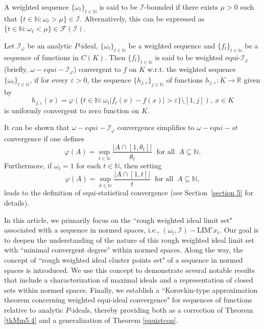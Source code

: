 \documentclass[reqno]{amsart}
\begin{document}
\begin{definition}
A weighted sequence $\{\omega_t\}_{t\in\mathbb{N}}$ is said to be $\mathcal{I}$-bounded if there exists $\mu > 0$ such that  $\{t \in \mathbb{N} : \omega_t > \mu\}\in\mathcal{I}$. Alternatively, this can be expressed as  $\{t \in \mathbb{N} : \omega_t < \mu\}\in\mathcal{F}(\mathcal{I})$.
\end{definition}
\begin{definition}\label{defIequi}
	Let $\mathcal{I}_{\varphi}$ be an analytic $P$-ideal, $\{\omega_t\}_{t\in\mathbb{N}}$ be a weighted sequence and $\{f_t\}_{t\in\mathbb{N}}$ be a sequence of functions in $C(K)$. Then $\{f_t\}_{t\in\mathbb{N}}$ is said to be weighted equi-$\mathcal{I}_{\varphi}$ (briefly, $\omega-equi-\mathcal{I}_{\varphi}$) convergent to $f$ on $K$ w.r.t. the weighted sequence $\{\omega_t\}_{t\in\mathbb{N}}$, if for every $\varepsilon>0$, the sequence $\{h_{j,\varepsilon}\}_{j\in\mathbb{N}}$ of functions $h_{j,\varepsilon}:K\to \mathbb{R}$ given by 
	\begin{equation}\label{equiideal}
		h_{j,\varepsilon}(x)=\varphi(\{t\in\mathbb{N}:\omega_t|f_t(x)-f(x)|> \varepsilon\}\setminus[1,j]),~x\in K
	\end{equation}
	is uniformly convergent to zero function on $K$.
	
	
 It can be shown that  $\omega-equi-\mathcal{I}_{\varphi}$ convergence simplifies to $\omega-equi-st$ convergence if one defines $$\varphi(A)=\sup_{t\in\mathbb{N}}\frac{|A\cap [1,\theta_t]|}{\theta_t}~\mbox{ for all }~A\subseteq \mathbb{N}.$$ Furthermore, if $\omega_t=1$ for each $t\in\mathbb{N}$, then setting 
 $$\varphi(A)=\sup_{k\in\mathbb{N}}\frac{|A\cap [1,t]|}{t}~\mbox{ for all }~A\subseteq \mathbb{N},$$
leads to the definition of equi-statistical convergence 
(see Section~\ref{section 5} for details).
\end{definition}

In this article, we primarily focus on the ``rough weighted ideal limit set" associated with a sequence in normed spaces, i.e., $(\omega_t, \mathcal{I})-\text{LIM}^r x_t$. Our goal is to deepen the understanding of the nature of this rough weighted ideal limit set with ``minimal convergent degree" within normed spaces. Along the way, the concept of ``rough weighted ideal cluster points set" of a sequence in normed spaces is introduced. We use this concept to demonstrate several notable results that include a characterization of maximal ideals and a representation of closed sets within normed spaces. Finally, we establish a ``Korovkin-type approximation theorem concerning weighted equi-ideal convergence" for sequences of functions relative to analytic $P$-ideals, thereby providing both as a correction of Theorem \ref{thMm5.4} and   a generalization of Theorem \ref{equistcon}.\\
\end{document}
